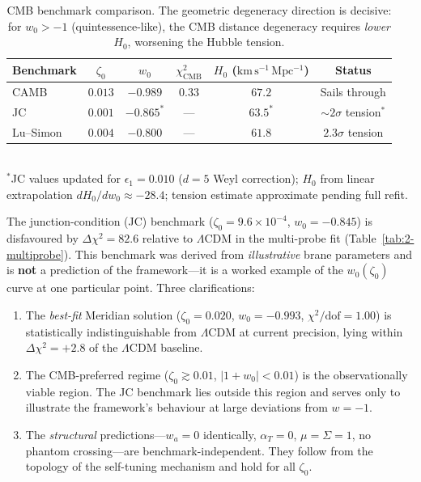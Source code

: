 \begin{table}[htbp]
\centering
\caption{CMB benchmark comparison. The geometric degeneracy direction is decisive: for $w_0 > -1$ (quintessence-like), the CMB distance degeneracy requires \emph{lower} $H_0$, worsening the Hubble tension.}
\label{tab:2-CMB-benchmarks}
\begin{tabular}{lccccc}
\toprule
Benchmark & $\zeta_0$ & $w_0$ & $\chi^2_\mathrm{CMB}$ & $H_0$ ($\mathrm{km\,s^{-1}\,Mpc^{-1}}$) & Status \\
\midrule
CAMB    & $0.013$ & $-0.989$ & $0.33$ & $67.2$ & Sails through \\
JC      & $0.001$ & $-0.865^*$ & ---    & $63.5^*$ & ${\sim}2\sigma$ tension$^*$ \\
Lu--Simon & $0.004$ & $-0.800$ & ---  & $61.8$ & $2.3\sigma$ tension \\
\bottomrule
\end{tabular}\\[2pt]
{\footnotesize ${}^*$JC values updated for $\epsilon_1 = 0.010$ ($d = 5$ Weyl correction); $H_0$ from linear extrapolation $dH_0/dw_0 \approx -28.4$; tension estimate approximate pending full refit.}
\end{table}

\begin{remark}\label{rem:2-benchmark-status}
The junction-condition (JC) benchmark ($\zeta_0 = 9.6 \times 10^{-4}$, $w_0 = -0.845$) is
disfavoured by $\Delta\chi^2 = 82.6$ relative to $\Lambda$CDM in the multi-probe fit
(Table~\ref{tab:2-multiprobe}).  This benchmark was derived from \emph{illustrative} brane
parameters and is \textbf{not} a prediction of the framework---it is a worked example of
the $w_0(\zeta_0)$ curve at one particular point.  Three clarifications:
\begin{enumerate}
\item The \emph{best-fit} Meridian solution ($\zeta_0 = 0.020$, $w_0 = -0.993$,
  $\chi^2/\mathrm{dof} = 1.00$) is statistically indistinguishable from $\Lambda$CDM at
  current precision, lying within $\Delta\chi^2 = +2.8$ of the $\Lambda$CDM baseline.
\item The CMB-preferred regime ($\zeta_0 \gtrsim 0.01$, $|1+w_0| < 0.01$) is the
  observationally viable region.  The JC benchmark lies outside this region and serves only
  to illustrate the framework's behaviour at large deviations from $w = -1$.
\item The \emph{structural} predictions---$w_a = 0$ identically, $\alpha_T = 0$,
  $\mu = \Sigma = 1$, no phantom crossing---are benchmark-independent.  They follow from
  the topology of the self-tuning mechanism and hold for all $\zeta_0$.
\end{enumerate}
\end{remark}

